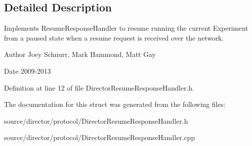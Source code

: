 \subsection{Detailed Description}
Implements Resume\-Response\-Handler to resume running the current Experiment from a paused state when a resume request is received over the network. 

\begin{DoxyAuthor}{Author}
Joey Schnurr, Mark Hammond, Matt Gay 
\end{DoxyAuthor}
\begin{DoxyDate}{Date}
2009-\/2013 
\end{DoxyDate}


Definition at line 12 of file Director\-Resume\-Response\-Handler.\-h.



The documentation for this struct was generated from the following files\-:\begin{DoxyCompactItemize}
\item 
source/director/protocol/Director\-Resume\-Response\-Handler.\-h\item 
source/director/protocol/Director\-Resume\-Response\-Handler.\-cpp\end{DoxyCompactItemize}
